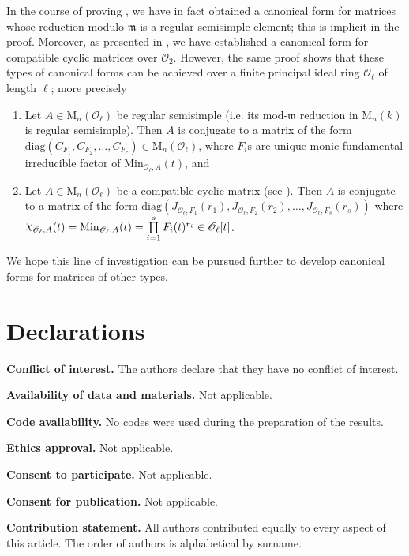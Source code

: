 \documentclass[11pt,twoside]{amsart}
\newcommand{\M}{\mathrm{M}}
\newcommand{\upchi}{\raisebox{0.4ex}{$\chi$}}
\newcommand{\Char}{\upchi}
\newcommand{\R}{\mathscr{O}_2}
\theoremstyle{definition} %
\begin{document}
In the course of proving , we have in fact obtained a canonical form for matrices whose reduction modulo $\mathfrak m$ is a regular semisimple element; this is implicit in the proof. Moreover, as presented in , we have established a canonical form for compatible cyclic matrices over $\R$. 
However, the same proof shows that these types of canonical forms can be achieved over a finite principal ideal ring $\mathscr O_\ell$ of length $\ell$; more precisely
\begin{enumerate}
    \item Let $A\in\M_n(\mathscr O_\ell)$ be regular semisimple (i.e. its mod-$\mathfrak m$ reduction in $\M_n(k)$ is regular semisimple). 
    Then $A$ is conjugate to a matrix of the form $\mathrm{diag}(C_{F_{1}},C_{F_2},\ldots,C_{F_r})\in\M_n(\mathscr O_\ell)$, where $F_i$s are unique monic fundamental irreducible factor of $\mathrm{Min}_{\mathscr O_\ell,A}(t)$, and
    \item Let $A\in\M_n(\mathscr O_\ell)$ be a compatible cyclic matrix (see ). 
    Then $A$ is conjugate to a matrix of the form $\mathrm{diag}(J_{\mathscr O_\ell,F_{1}}(r_1),J_{\mathscr O_\ell,F_{2}}(r_2),\ldots,J_{\mathscr O_\ell,F_{s}}(r_s))$ where $\Char_{\mathscr O_\ell,A}(t)=\mathrm{Min}_{\mathscr O_\ell,A}(t)=\prod\limits_{i=1}^sF_i(t)^{r_i}\in\mathscr O_\ell[t]$.
\end{enumerate}
We hope this line of investigation can be pursued further to develop canonical forms for matrices of other types.










\section*{Declarations}


\noindent\textbf{Conflict of interest.} The authors declare that they have no conflict of interest.  

\noindent\textbf{Availability of data and materials.} Not applicable.  

\noindent\textbf{Code availability.} No codes were used during the preparation of the results.

\noindent\textbf{Ethics approval.} Not applicable.  

\noindent\textbf{Consent to participate.} Not applicable.  

\noindent\textbf{Consent for publication.} Not applicable. 

\noindent\textbf{Contribution statement.} All authors contributed equally to every aspect of this article. The order of authors is alphabetical by surname.
\printbibliography
\vspace{2em}
\end{document}
